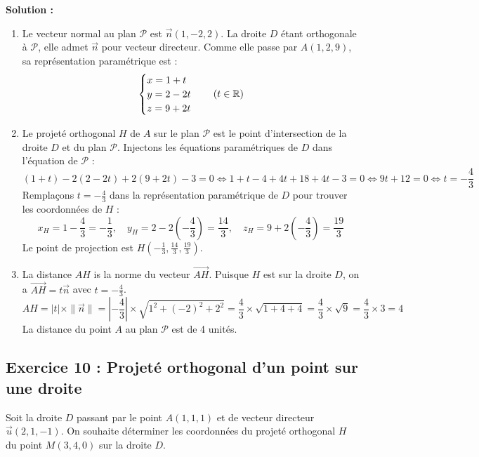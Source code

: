 \textbf{Solution :}
\begin{enumerate}
    \item Le vecteur normal au plan $\mathcal{P}$ est $\vec{n}(1, -2, 2)$. La droite $D$ étant orthogonale à $\mathcal{P}$, elle admet $\vec{n}$ pour vecteur directeur. Comme elle passe par $A(1, 2, 9)$, sa représentation paramétrique est :
    \[
    \begin{cases}
    x = 1 + t \\
    y = 2 - 2t \\
    z = 9 + 2t
    \end{cases} \quad (t \in \mathbb{R})
    \]
    
    \item Le projeté orthogonal $H$ de $A$ sur le plan $\mathcal{P}$ est le point d'intersection de la droite $D$ et du plan $\mathcal{P}$. Injectons les équations paramétriques de $D$ dans l'équation de $\mathcal{P}$ :
    \[
    (1 + t) - 2(2 - 2t) + 2(9 + 2t) - 3 = 0 \iff 1 + t - 4 + 4t + 18 + 4t - 3 = 0 \iff 9t + 12 = 0 \iff t = -\frac{4}{3}
    \]
    Remplaçons $t = -\frac{4}{3}$ dans la représentation paramétrique de $D$ pour trouver les coordonnées de $H$ :
    \[
    x_H = 1 - \frac{4}{3} = -\frac{1}{3}, \quad y_H = 2 - 2\left(-\frac{4}{3}\right) = \frac{14}{3}, \quad z_H = 9 + 2\left(-\frac{4}{3}\right) = \frac{19}{3}
    \]
    Le point de projection est $H\left(-\frac{1}{3}, \frac{14}{3}, \frac{19}{3}\right)$.
    
    \item La distance $AH$ is la norme du vecteur $\vec{AH}$. Puisque $H$ est sur la droite $D$, on a $\vec{AH} = t \vec{n}$ avec $t = -\frac{4}{3}$.
    \[
    AH = |t| \times \|\vec{n}\| = \left|-\frac{4}{3}\right| \times \sqrt{1^2 + (-2)^2 + 2^2} = \frac{4}{3} \times \sqrt{1 + 4 + 4} = \frac{4}{3} \times \sqrt{9} = \frac{4}{3} \times 3 = 4
    \]
    La distance du point $A$ au plan $\mathcal{P}$ est de 4 unités.
\end{enumerate}

\subsection*{Exercice 10 : Projeté orthogonal d'un point sur une droite}
Soit la droite $D$ passant par le point $A(1, 1, 1)$ et de vecteur directeur $\vec{u}(2, 1, -1)$. On souhaite déterminer les coordonnées du projeté orthogonal $H$ du point $M(3, 4, 0)$ sur la droite $D$.

